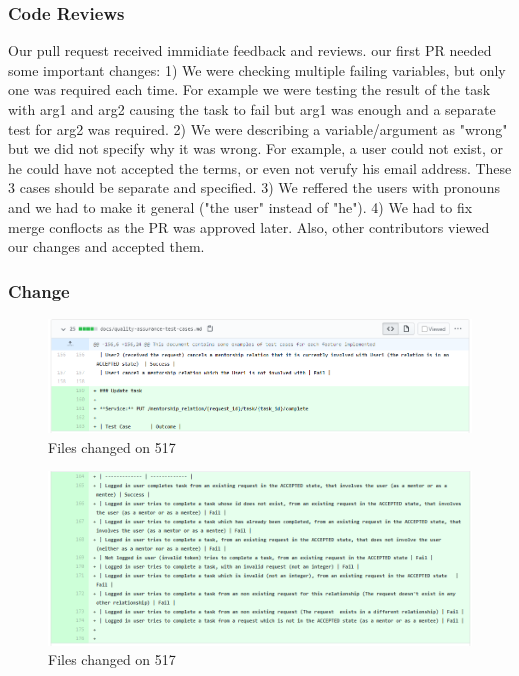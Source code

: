 \documentclass{article}
\begin{document}
\subsubsection{Code Reviews}
\hspace{0.5cm}Our pull request received immidiate feedback and reviews. our first PR needed some important changes:
1) We were checking multiple failing variables, but only one was required each time. For example we were testing the result of the task with arg1 and arg2 causing the task to fail but arg1 was enough and a separate test for arg2 was required. 
2) We were describing a variable/argument as "wrong" but we did not specify why it was wrong. For example, a user could not exist, or he could have not accepted the terms, or even not verufy his email address. These 3 cases should be separate and specified.
3) We reffered the users with pronouns and we had to make it general ("the user" instead of "he").
4) We had to fix merge conflocts as the PR was approved later.
 Also, other contributors viewed our changes and accepted them. 
\subsubsection{Change}
\begin{figure}[tph!]
\centerline{\includegraphics[totalheight=13cm, width=15cm]{517Changes_1.png}}
    \caption{Files changed on 517}
    \label{fig:verticalcell}
\end{figure}
\begin{figure}[tph!]
\centerline{\includegraphics[totalheight=13cm, width=15cm]{517Changes_2.png}}
    \caption{Files changed on 517}
    \label{fig:verticalcell}
\end{figure}
\vfill
\clearpage
\end{document}

